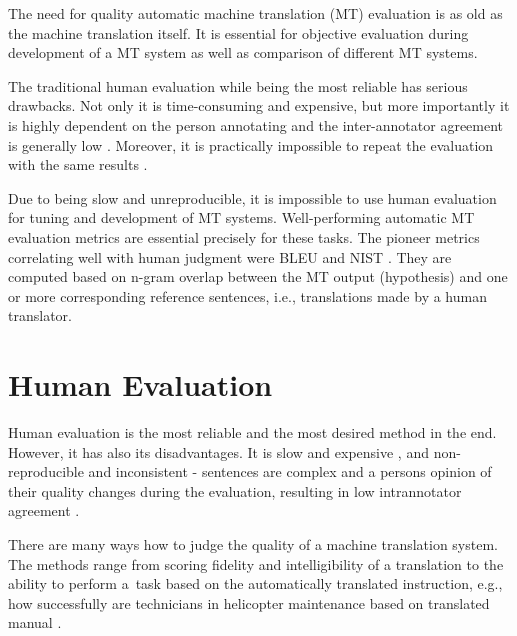 The need for quality automatic machine translation (MT) evaluation is as old as
the machine translation itself. It is essential for objective evaluation during
development of a MT system as well as comparison of different MT systems.

The traditional human evaluation while being the most reliable has serious 
drawbacks. Not only it is time-consuming and expensive, but more importantly
it is highly dependent on the person annotating and the inter-annotator 
agreement is generally low  \cite{wmt13}. Moreover, it is practically 
impossible to repeat the evaluation with the same results \cite{bojar-kniha}.

Due to being slow and unreproducible, it is impossible to use human evaluation
for tuning and development of MT systems. Well-performing automatic MT 
evaluation metrics are essential precisely for these tasks. The pioneer metrics 
correlating well with human judgment were BLEU \cite{bleu} and NIST \cite{nist}. 
They are computed based on n-gram overlap between the MT output (hypothesis) and 
one or more corresponding reference sentences, i.e., translations made by a human 
translator.




\section{Human Evaluation}
Human evaluation is the most reliable and the most desired method in the end.
However, it has also its disadvantages. It is slow and expensive , 
and non-reproducible and inconsistent - sentences are complex and a persons
opinion of their quality changes during the evaluation, resulting in low
intrannotator agreement .

There are many ways how to judge the quality of a machine translation system. 
The methods range from scoring fidelity and intelligibility of a translation
to the ability to perform a~task based on the automatically translated instruction, e.g., 
how successfully are technicians in  helicopter maintenance based on translated 
manual \cite{Sinaiko}.

